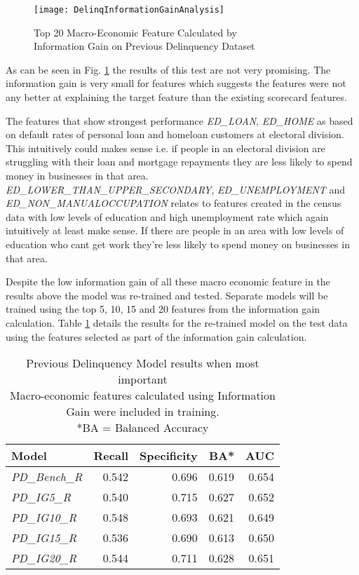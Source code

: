 \begin{figure}[H]
	\texttt{[image: DelinqInformationGainAnalysis]}
	\caption{Top 20 Macro-Economic Feature Calculated by \\ Information Gain on Previous Delinquency Dataset}
	\label{fig:DelinqInformationGainAnalysis}
\end{figure}

As can be seen in Fig. \ref{fig:DelinqInformationGainAnalysis} the results of this test are not very promising. The information gain is very small for features which suggests the features were not any better at explaining the target feature than the existing scorecard features. 

The features that show strongest performance \textit{ED\_LOAN}, \textit{ED\_HOME} as based on default rates of personal loan and homeloan customers at electoral division. This intuitively could makes sense i.e. if people in an electoral division are struggling with their loan and mortgage repayments they are less likely to spend money in businesses in that area. \textit{ED\_LOWER\_THAN\_UPPER\_SECONDARY}, \textit{ED\_UNEMPLOYMENT} and \textit{ED\_NON\_MANUALOCCUPATION} relates to features created in the census data with low levels of education and high unemployment rate which again intuitively at least make sense. If there are people in an area with low levels of education who cant get work they're less likely to spend money on businesses in that area.

Despite the low information gain of all these macro economic feature in the results above the model was re-trained and tested. Separate models will be trained using the top 5, 10, 15 and 20 features from the information gain calculation. Table \ref{table:InfoGainPDModelResults} details the results for the re-trained model on the test data using the features selected as part of the information gain calculation.

\begin{table}[H]
\centering
\small
		\begin{tabular}{l r r r r}
			\hline
			\textbf{Model} & \textbf{Recall} & \textbf{Specificity} & \textbf{BA*} & \textbf{AUC}  \\ \hline
			\textit{PD\_Bench\_R} & 0.542 & 0.696 & 0.619 & \cellcolor{green!25}0.654 \\ \hline
			\textit{PD\_IG5\_R} & 0.540 & \cellcolor{green!25}0.715 & 0.627 & 0.652   \\ 
			\textit{PD\_IG10\_R} & \cellcolor{green!25}0.548 & 0.693 & 0.621 & 0.649  \\ 
			\textit{PD\_IG15\_R} & 0.536 & 0.690 & 0.613 & 0.650  \\
			\textit{PD\_IG20\_R} & 0.544 & 0.711 & \cellcolor{green!25}0.628 & 0.651 \\\hline 
		\end{tabular}
	\caption{Previous Delinquency Model results when most important \\Macro-economic features calculated using Information Gain were included in training.\\
		*BA = Balanced Accuracy}
	\label{table:InfoGainPDModelResults}
\end{table}

